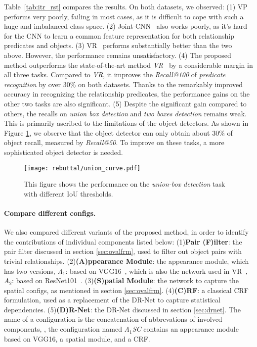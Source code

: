 \documentclass[10pt,twocolumn,letterpaper]{article}
\begin{document}
Table~\ref{tab:itr_rst} compares the results. On both datasets, we observed:
(1) VP~\cite{sadeghi2011recognition} performs very poorly, failing in most cases,
as it is difficult to cope with such a huge and imbalanced class space.
(2) Joint-CNN~\cite{fang2015captions} also works poorly, as
it's hard for the CNN to learn a common feature representation for both
relationship predicates and objects.
(3) VR~\cite{lu2016visual} performs substantially better than the two above.
However, the performance remains unsatisfactory.
(4) The proposed method outperforms the state-of-the-art method \emph{VR}~\cite{lu2016visual} by a considerable margin
in all three tasks.
Compared to \emph{VR}, it improves the \emph{Recall@100} of \emph{predicate recognition} by over $30\%$ on both datasets.
Thanks to the remarkably improved accuracy in recognizing the relationship predicates,
the performance gains on the other two tasks are also significant.
(5) Despite the significant gain compared to others,
the recalls on \emph{union box detection} and \emph{two boxes detection}
remains weak. This is primarily ascribed to the limitations of the object detectors.
As shown in Figure \ref{fig:iou_relax}, we observe that
the object detector can only obtain about $30\%$ of object recall, measured by \emph{Recall@50}.
To improve on these tasks, a more sophisticated object detector is needed.

\begin{figure}
	\centering
	\texttt{[image: rebuttal/union\_curve.pdf]}
	\caption{\small This figure shows the performance on the \emph{union-box detection} task with different IoU thresholds.}
	\label{fig:iou_relax}
\end{figure}\paragraph{Compare different configs.}

We also compared different variants of the proposed method, in order
to identify the contributions of individual components listed below:
%
(1)\textbf{Pair (F)ilter}: the pair filter discussed in section \ref{sec:ovalfrm},
used to filter out object pairs with trivial relationships.
%
(2)\textbf{(A)ppearance Module}: the appearance module, which has two versions,
\emph{A$_1$}: based on VGG16~\cite{Simonyan14c}, which is also the network used in VR~\cite{lu2016visual},
\emph{A$_2$}: based on ResNet101~\cite{he2015deep}.
%
(3)\textbf{(S)patial Module}: the network to capture the spatial configs, as mentioned in section \ref{sec:ovalfrm}.
%
(4)\textbf{(C)RF}: a classical CRF formulation, used as a replacement of the DR-Net to capture statistical dependencies.
%
(5)\textbf{(D)R-Net}: the DR-Net discussed in section \ref{sec:drnet}.
%
The name of a configuration is the concatenation of abbrevations of involved components,
\eg, the configuration named \emph{A$_1$SC} contains an appearance module based on VGG16, a spatial module, and a CRF.
\end{document}

